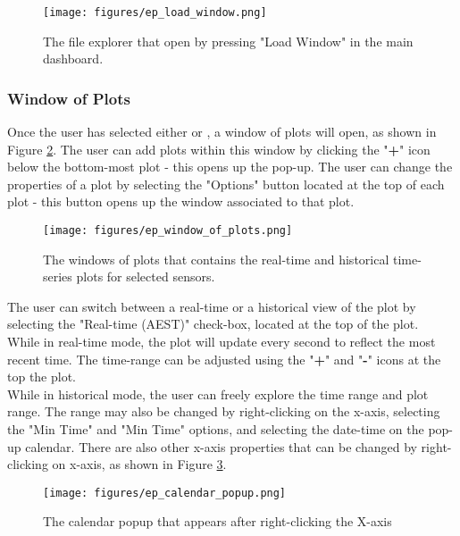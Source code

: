 \documentclass{article}
\begin{document}
\begin{figure} [h]
    \centering
    \texttt{[image: figures/ep\_load\_window.png]}
    \caption{\label{fig:ep_load_window} The file explorer that open by pressing "Load Window" in the main dashboard.}
\end{figure}

\newpage

\subsubsection{Window of Plots}
\label{sec:Window_Plots}
Once the user has selected either \textbf{} or \textbf{}, a window of plots will open, as shown in Figure \ref{fig:window_of_plots}. The user can add plots within this window by clicking the "\textbf{+}" icon below the bottom-most plot - this opens up the \textbf{} pop-up. The user can change the properties of a plot by selecting the "Options" button located at the top of each plot - this button opens up the \textbf{} window associated to that plot. 

\begin{figure} [h]
    \centering
    \texttt{[image: figures/ep\_window\_of\_plots.png]}
    \caption{\label{fig:window_of_plots} The windows of plots that contains the real-time and historical time-series plots for selected sensors.}
\end{figure}

\vspace{5pt}
\noindent
The user can switch between a real-time or a historical view of the plot by selecting the "Real-time (AEST)" check-box, located at the top of the plot. \\
While in real-time mode, the plot will update every second to reflect the most recent time. The time-range can be adjusted using the "\textbf{+}" and "\textbf{-}" icons at the top the plot. \\
While in historical mode, the user can freely explore the time range and plot range. The range may also be changed by right-clicking on the x-axis, selecting the "Min Time" and "Min Time" options, and selecting the date-time on the pop-up calendar. There are also other x-axis properties that can be changed by right-clicking on x-axis, as shown in Figure \ref{fig:ep_calendar_popup}.

\begin{figure} [h]
    \centering
    \texttt{[image: figures/ep\_calendar\_popup.png]}
    \caption{\label{fig:ep_calendar_popup} The calendar popup that appears after right-clicking the X-axis}
\end{figure}
\end{document}

